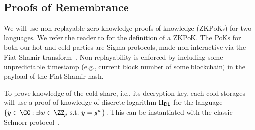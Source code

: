 \subsection{Proofs of Remembrance}\label{sec:hotproofs}


We will use non-replayable zero-knowledge proofs of knowledge (ZKPoKs) for two languages. We refer the reader to \cite{Thaler22} for the definition of a ZKPoK. The PoKs for both our hot and cold parties are Sigma protocols, made non-interactive via the Fiat-Shamir transform~\cite{C:FiaSha86}. Non-replayability is enforced by including some unpredictable timestamp (e.g., current block number of some blockchain) in the payload of the Fiat-Shamir hash.


To prove knowledge of the cold share, i.e., its decryption key, each cold storages will use a proof of knowledge of discrete logarithm $\Pi_{\sf DL}$ for the language $\{y \in \GG : \exists w \in \ZZ_p ~\text{s.t.}\ y = g^w\}$. This can be instantiated with the classic Schnorr protocol~\cite{C:Schnorr89}.

